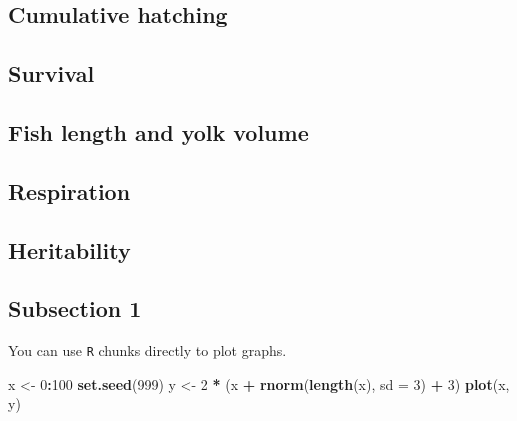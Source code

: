\documentclass[utf8]{frontiersSCNS}
\newenvironment{Shaded}{\begin{snugshade}}{\end{snugshade}}
\newcommand{\AttributeTok}[1]{\textcolor[rgb]{0.13,0.29,0.53}{#1}}
\newcommand{\DecValTok}[1]{\textcolor[rgb]{0.00,0.00,0.81}{#1}}
\newcommand{\FunctionTok}[1]{\textcolor[rgb]{0.13,0.29,0.53}{\textbf{#1}}}
\newcommand{\NormalTok}[1]{#1}
\newcommand{\OtherTok}[1]{\textcolor[rgb]{0.56,0.35,0.01}{#1}}
\newcommand{\SpecialCharTok}[1]{\textcolor[rgb]{0.81,0.36,0.00}{\textbf{#1}}}
\begin{document}
\hypertarget{cumulative-hatching}{%
\subsection*{Cumulative hatching}\label{cumulative-hatching}}

\hypertarget{survival-1}{%
\subsection*{Survival}\label{survival-1}}

\hypertarget{fish-length-and-yolk-volume-1}{%
\subsection*{Fish length and yolk
volume}\label{fish-length-and-yolk-volume-1}}

\hypertarget{respiration-1}{%
\subsection*{Respiration}\label{respiration-1}}

\hypertarget{heritability-1}{%
\subsection*{Heritability}\label{heritability-1}}

\hypertarget{subsection-1}{%
\subsection*{Subsection 1}\label{subsection-1}}

You can use \texttt{R} chunks directly to plot graphs.

\begin{Shaded}
\begin{Highlighting}[]
\NormalTok{x }\OtherTok{\textless{}{-}} \DecValTok{0}\SpecialCharTok{:}\DecValTok{100}
\FunctionTok{set.seed}\NormalTok{(}\DecValTok{999}\NormalTok{)}
\NormalTok{y }\OtherTok{\textless{}{-}} \DecValTok{2} \SpecialCharTok{*}\NormalTok{ (x }\SpecialCharTok{+} \FunctionTok{rnorm}\NormalTok{(}\FunctionTok{length}\NormalTok{(x), }\AttributeTok{sd =} \DecValTok{3}\NormalTok{) }\SpecialCharTok{+} \DecValTok{3}\NormalTok{)}
\FunctionTok{plot}\NormalTok{(x, y)}
\end{Highlighting}
\end{Shaded}
\end{document}
